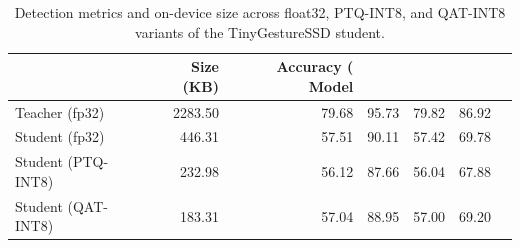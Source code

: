 \begin{table}
\caption{Detection metrics and on-device size across float32, PTQ-INT8, and QAT-INT8 variants of the TinyGestureSSD student.}
\label{tab:qat_comparison}
\begin{tabular}{lrrrrr}
\toprule
 & Size (KB) & Accuracy (%
Model &  &  &  &  &  \\
\midrule
Teacher (fp32) & 2283.50 & 79.68 & 95.73 & 79.82 & 86.92 \\
Student (fp32) & 446.31 & 57.51 & 90.11 & 57.42 & 69.78 \\
Student (PTQ-INT8) & 232.98 & 56.12 & 87.66 & 56.04 & 67.88 \\
Student (QAT-INT8) & 183.31 & 57.04 & 88.95 & 57.00 & 69.20 \\
\bottomrule
\end{tabular}
\end{table}
